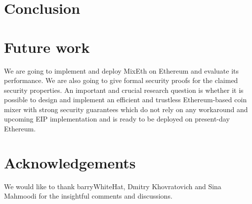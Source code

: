 \documentclass[a4paper]{article}
\theoremstyle{definition}
\begin{document}
\section{Conclusion} \label{conclusion}
 
\section{Future work}
We are going to implement and deploy MixEth on Ethereum and evaluate its performance. We are also going to give formal security proofs for the claimed security properties.  
An important and crucial research question is whether it is possible to design and implement an efficient and trustless Ethereum-based coin mixer with strong security guarantees which do not rely on any workaround and upcoming EIP implementation and is ready to be deployed on present-day Ethereum. 

\section{Acknowledgements}
We would like to thank barryWhiteHat, Dmitry Khovratovich and Sina Mahmoodi for the insightful comments and discussions. 



\end{document}
